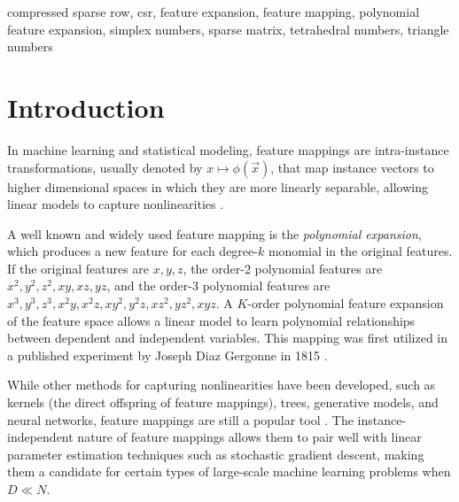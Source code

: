 \documentclass[journal]{journal}
\begin{document}
\begin{IEEEkeywords}
compressed sparse row, csr, feature expansion, feature mapping, polynomial feature expansion, simplex numbers, sparse matrix, tetrahedral numbers, triangle numbers
\end{IEEEkeywords}






%
\IEEEpeerreviewmaketitle


\section{Introduction}

In machine learning and statistical modeling, feature mappings are intra-instance transformations, usually denoted by $x \mapsto \phi(\vec{x})$, that map instance vectors to higher dimensional spaces in which they are more linearly separable, allowing linear models to capture nonlinearities \cite{yuan2012recent}.

A well known and widely used feature mapping is the \emph{polynomial expansion}, which produces a new feature for each degree-$k$ monomial in the original features.
If the original features are $x,y,z$, the order-2 polynomial features are $x^2, y^2, z^2, xy, xz, yz$, and the order-3 polynomial features are $x^3, y^3, z^3, x^2y, x^2z, xy^2, y^2z, xz^2, yz^2, xyz$.
A $K$-order polynomial feature expansion of the feature space allows a linear model to learn polynomial relationships between dependent and independent variables.
This mapping was first utilized in a published experiment by Joseph Diaz Gergonne in 1815 \cite{gergonne1974application, smith1918standard}.

While other methods for capturing nonlinearities have been developed, such as kernels (the direct offspring of feature mappings), trees, generative models, and neural networks, feature mappings are still a popular tool \cite{barker200114, chang2010training, shaw2006intellectual}.
The instance-independent nature of feature mappings allows them to pair well with linear parameter estimation techniques such as stochastic gradient descent, making them a candidate for certain types of large-scale machine learning problems when $D \ll N$.
\end{document}
